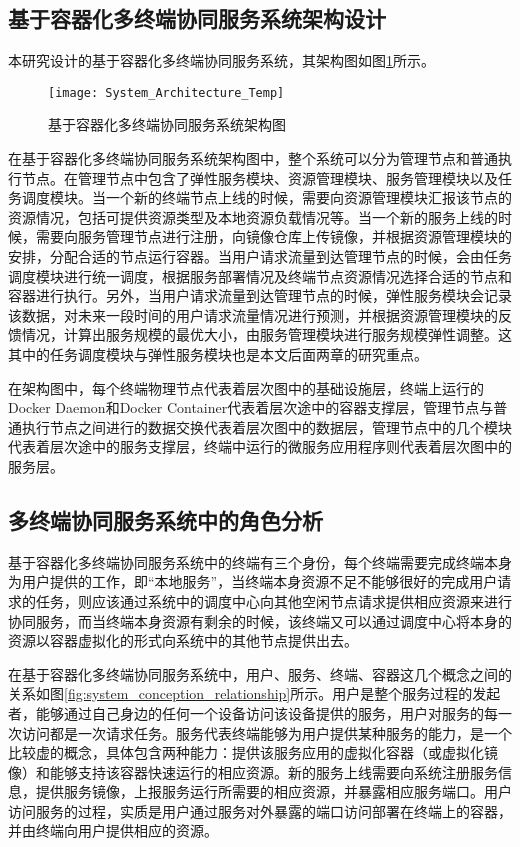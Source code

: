 \subsection{基于容器化多终端协同服务系统架构设计}
本研究设计的基于容器化多终端协同服务系统，其架构图如图\ref{fig:system_architecture}所示。
\begin{figure}[!htbp]
    \centering
    \texttt{[image: System\_Architecture\_Temp]}
    \caption{基于容器化多终端协同服务系统架构图}
    \label{fig:system_architecture}
\end{figure}

在基于容器化多终端协同服务系统架构图中，整个系统可以分为管理节点和普通执行节点。在管理节点中包含了弹性服务模块、资源管理模块、服务管理模块以及任务调度模块。当一个新的终端节点上线的时候，需要向资源管理模块汇报该节点的资源情况，包括可提供资源类型及本地资源负载情况等。当一个新的服务上线的时候，需要向服务管理节点进行注册，向镜像仓库上传镜像，并根据资源管理模块的安排，分配合适的节点运行容器。当用户请求流量到达管理节点的时候，会由任务调度模块进行统一调度，根据服务部署情况及终端节点资源情况选择合适的节点和容器进行执行。另外，当用户请求流量到达管理节点的时候，弹性服务模块会记录该数据，对未来一段时间的用户请求流量情况进行预测，并根据资源管理模块的反馈情况，计算出服务规模的最优大小，由服务管理模块进行服务规模弹性调整。这其中的任务调度模块与弹性服务模块也是本文后面两章的研究重点。

在架构图中，每个终端物理节点代表着层次图中的基础设施层，终端上运行的Docker Daemon和Docker Container代表着层次途中的容器支撑层，管理节点与普通执行节点之间进行的数据交换代表着层次图中的数据层，管理节点中的几个模块代表着层次途中的服务支撑层，终端中运行的微服务应用程序则代表着层次图中的服务层。

\subsection{多终端协同服务系统中的角色分析}

基于容器化多终端协同服务系统中的终端有三个身份，每个终端需要完成终端本身为用户提供的工作，即“本地服务”，当终端本身资源不足不能够很好的完成用户请求的任务，则应该通过系统中的调度中心向其他空闲节点请求提供相应资源来进行协同服务，而当终端本身资源有剩余的时候，该终端又可以通过调度中心将本身的资源以容器虚拟化的形式向系统中的其他节点提供出去。

在基于容器化多终端协同服务系统中，用户、服务、终端、容器这几个概念之间的关系如图\ref{fig:system_conception_relationship}所示。用户是整个服务过程的发起者，能够通过自己身边的任何一个设备访问该设备提供的服务，用户对服务的每一次访问都是一次请求任务。服务代表终端能够为用户提供某种服务的能力，是一个比较虚的概念，具体包含两种能力：提供该服务应用的虚拟化容器（或虚拟化镜像）和能够支持该容器快速运行的相应资源。新的服务上线需要向系统注册服务信息，提供服务镜像，上报服务运行所需要的相应资源，并暴露相应服务端口。用户访问服务的过程，实质是用户通过服务对外暴露的端口访问部署在终端上的容器，并由终端向用户提供相应的资源。

